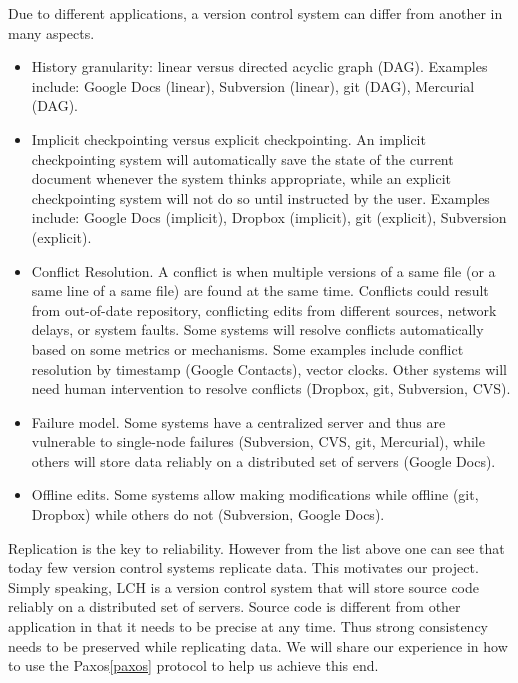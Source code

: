 \documentclass[11pt]{article}
\begin{document}
Due to different applications, a version control system can differ from another in many aspects.
\begin{itemize}
    \item History granularity: linear versus directed acyclic graph (DAG).
        Examples include: Google Docs (linear), Subversion (linear), git (DAG), Mercurial (DAG).
    \item Implicit checkpointing versus explicit checkpointing.
        An implicit checkpointing system will automatically save the state of the current document whenever the system thinks appropriate, while an explicit checkpointing system will not do so until instructed by the user.
        Examples include: Google Docs (implicit), Dropbox (implicit), git (explicit), Subversion (explicit).
    \item Conflict Resolution.
        A conflict is when multiple versions of a same file (or a same line of a same file) are found at the same time.
        Conflicts could result from out-of-date repository, conflicting edits from different sources, network delays, or system faults.
        Some systems will resolve conflicts automatically based on some metrics or mechanisms.
        Some examples include conflict resolution by timestamp (Google Contacts), vector clocks.
        Other systems will need human intervention to resolve conflicts (Dropbox, git, Subversion, CVS).
    \item Failure model.
        Some systems have a centralized server and thus are vulnerable to single-node failures (Subversion, CVS, git, Mercurial\footnotemark),
        while others will store data reliably on a distributed set of servers (Google Docs).
    \item Offline edits.
        Some systems allow making modifications while offline (git, Dropbox) while others do not (Subversion, Google Docs).
\end{itemize}

Replication is the key to reliability.
However from the list above one can see that today few version control systems replicate data.
This motivates our project.
Simply speaking, LCH is a version control system that will store source code reliably on a distributed set of servers.
Source code is different from other application in that it needs to be precise at any time.
Thus strong consistency needs to be preserved while replicating data.
We will share our experience in how to use the Paxos\ref{paxos} protocol to help us achieve this end.
\end{document}
